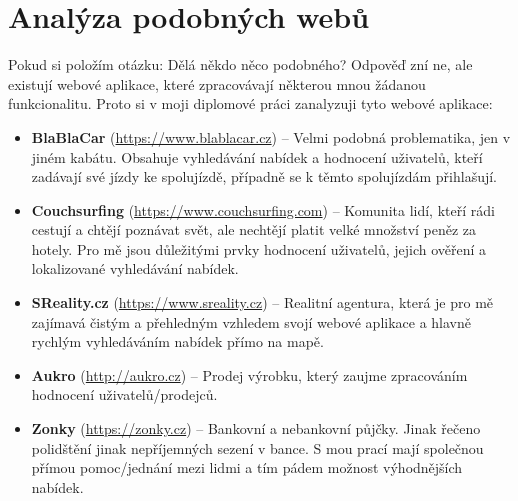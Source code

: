 \chapter{Analýza podobných webů}
\label{analyza}

Pokud si položím otázku: Dělá někdo něco podobného? Odpověď zní ne, ale existují webové aplikace, které zpracovávají některou mnou žádanou funkcionalitu. Proto si v moji diplomové práci zanalyzuji tyto webové aplikace:
\begin{itemize}
	\item \textbf{BlaBlaCar} \cite{blablacar} (\url{https://www.blablacar.cz}) – Velmi podobná problematika, jen v jiném kabátu. Obsahuje vyhledávání nabídek a hodnocení uživatelů, kteří zadávají své jízdy ke spolujízdě, případně se k těmto spolujízdám přihlašují.

	\item \textbf{Couchsurfing} \cite{couchsurfing} (\url{https://www.couchsurfing.com}) – Komunita lidí, kteří rádi cestují a chtějí poznávat svět, ale nechtějí platit velké množství peněz za hotely. Pro mě jsou důležitými prvky hodnocení uživatelů, jejich ověření a lokalizované vyhledávání nabídek.

	\item \textbf{SReality.cz} \cite{sreality} (\url{https://www.sreality.cz}) – Realitní agentura, která je pro mě zajímavá čistým a přehledným vzhledem svojí webové aplikace a hlavně rychlým vyhledáváním nabídek přímo na mapě.

	\item \textbf{Aukro} \cite{aukro} (\url{http://aukro.cz}) – Prodej výrobku, který zaujme zpracováním hodnocení uživatelů/prodejců.

	\item \textbf{Zonky} \cite{zonky} (\url{https://zonky.cz}) – Bankovní a nebankovní půjčky. Jinak řečeno polidštění jinak nepříjemných sezení v bance. S mou prací mají společnou přímou pomoc/jednání mezi lidmi a tím pádem možnost výhodnějších nabídek.
\end{itemize}

\newpage

\newpage

\newpage

\newpage

\newpage

